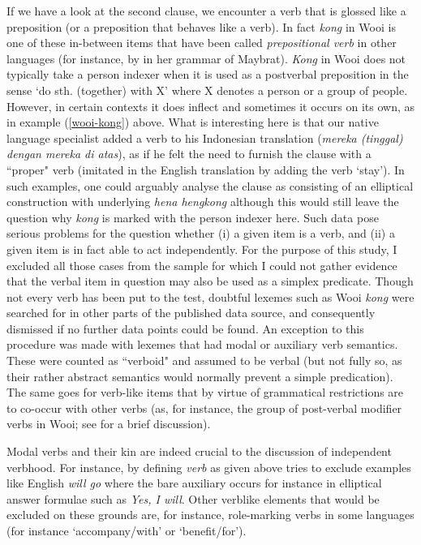 If we have a look at the second clause, we encounter a verb that is glossed like a preposition (or a preposition that behaves like a verb). In fact \textit{kong} in Wooi is one of these in-between items that have been called \textit{prepositional verb} in other languages (for instance, by \citet{dol2007grammar} in her grammar of Maybrat). \textit{Kong} in Wooi does not typically take a person indexer when it is used as a postverbal preposition in the sense `do sth. (together) with X' where X denotes a person or a group of people. However, in certain contexts it does inflect and sometimes it occurs on its own, as in example (\ref{wooi-kong}) above. What is interesting here is that our native language specialist added a verb to his Indonesian translation (\textit{mereka (tinggal) dengan mereka di atas}), as if he felt the need to furnish the clause with a ``proper" verb (imitated in the English translation by adding the verb `stay'). In such examples, one could arguably analyse the clause as consisting of an elliptical construction with underlying \textit{hena hengkong} although this would still leave the question why \textit{kong} is marked with the person indexer here. Such data pose serious problems for the question whether (i) a given item is a verb, and (ii) a given item is in fact able to act independently. For the purpose of this study, I excluded all those cases from the sample for which I could not gather evidence that the verbal item in question may also be used as a simplex predicate. Though not every verb has been put to the test, doubtful lexemes such as Wooi \textit{kong} were searched for in other parts of the published data source, and consequently dismissed if no further data points could be found. An exception to this procedure was made with lexemes that had modal or auxiliary verb semantics. These were counted as ``verboid" and assumed to be verbal (but not fully so, as their rather abstract semantics would normally prevent a simple predication). The same goes for verb-like items that by virtue of grammatical restrictions are to co-occur with other verbs (as, for instance, the group of post-verbal modifier verbs in Wooi; see  for a brief discussion).

Modal verbs and their kin are indeed crucial to the discussion of independent verbhood. For instance, by defining \textit{verb} as given above \citet{haspelmath2016serial} tries to exclude examples like English \textit{will go} where the bare auxiliary occurs for instance in elliptical answer formulae such as \textit{Yes, I will}. Other verblike elements that would be excluded on these grounds are, for instance, role-marking verbs in some languages (for instance `accompany/with' or `benefit/for'). 

